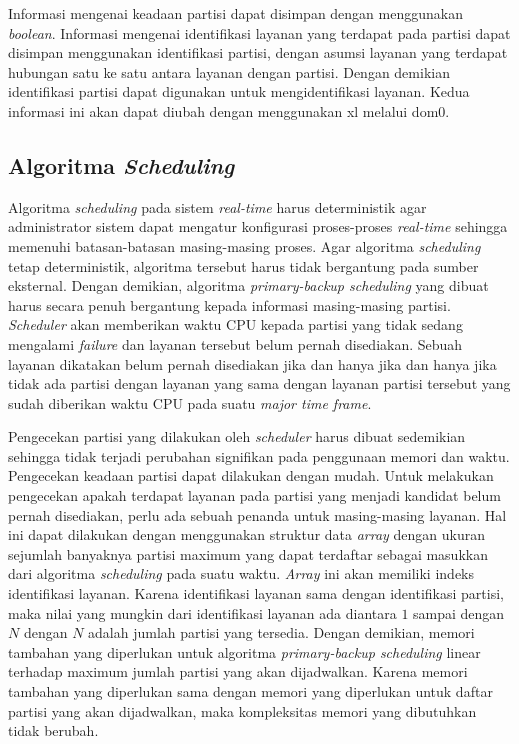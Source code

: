 Informasi mengenai keadaan partisi dapat disimpan dengan menggunakan \textit{boolean}. Informasi
mengenai identifikasi layanan yang terdapat pada partisi dapat disimpan menggunakan identifikasi
partisi, dengan asumsi layanan yang terdapat hubungan satu ke satu antara layanan dengan
partisi. Dengan demikian identifikasi partisi dapat digunakan untuk mengidentifikasi layanan.
Kedua informasi ini akan dapat diubah dengan menggunakan xl melalui dom0.

\subsection{Algoritma \textit{Scheduling}}
\label{section:algoritma_scheduling}

Algoritma \textit{scheduling} pada sistem \textit{real-time} harus deterministik agar
administrator sistem dapat mengatur konfigurasi proses-proses \textit{real-time} sehingga
memenuhi batasan-batasan masing-masing proses. Agar algoritma \textit{scheduling} tetap
deterministik, algoritma tersebut harus tidak bergantung pada sumber eksternal. Dengan demikian,
algoritma \textit{primary-backup scheduling} yang dibuat harus secara penuh bergantung kepada
informasi masing-masing partisi. \textit{Scheduler} akan memberikan waktu CPU kepada partisi
yang tidak sedang mengalami \textit{failure} dan layanan tersebut belum pernah
disediakan. Sebuah layanan dikatakan belum pernah disediakan jika dan hanya jika dan
hanya jika tidak ada partisi dengan layanan yang sama dengan layanan partisi
tersebut yang sudah diberikan waktu CPU pada suatu \textit{major time frame}.

Pengecekan partisi yang dilakukan oleh \textit{scheduler} harus dibuat sedemikian sehingga tidak
terjadi perubahan signifikan pada penggunaan memori dan waktu. Pengecekan keadaan partisi dapat
dilakukan dengan mudah. Untuk melakukan pengecekan apakah terdapat layanan pada partisi
yang menjadi kandidat belum pernah disediakan, perlu ada sebuah penanda untuk masing-masing
layanan. Hal ini dapat dilakukan dengan menggunakan struktur data \textit{array} dengan
ukuran sejumlah banyaknya partisi maximum yang dapat terdaftar sebagai masukkan dari algoritma
\textit{scheduling} pada suatu waktu. \textit{Array} ini akan memiliki indeks identifikasi
layanan. Karena identifikasi layanan sama dengan identifikasi partisi, maka
nilai yang mungkin dari identifikasi layanan ada diantara $1$ sampai dengan $N$ dengan
$N$ adalah jumlah partisi yang tersedia. Dengan demikian, memori tambahan yang diperlukan untuk
algoritma \textit{primary-backup scheduling} linear terhadap maximum jumlah partisi yang akan
dijadwalkan. Karena memori tambahan yang diperlukan sama dengan memori yang diperlukan untuk
daftar partisi yang akan dijadwalkan, maka kompleksitas memori yang dibutuhkan tidak berubah.

